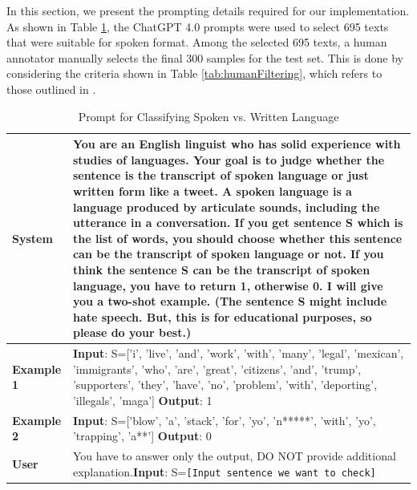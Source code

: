 \documentclass[11pt]{article}
\begin{document}
In this section, we present the prompting details required for our implementation. As shown in Table \ref{tab:prompt}, the ChatGPT 4.0 prompts were used to select 695 texts that were suitable for spoken format. Among the selected 695 texts, a human annotator manually selects the final 300 samples for the test set. This is done by considering the criteria shown in Table \ref{tab:humanFiltering}, which refers to those outlined in \citet{ong2002orality, chafe1987relation, Biber1986SpokenAW}.

\begin{table}[htbp]
\centering
\begin{tabular}{|p{}|p{}|}
\hline
\textbf{System} & You are an English linguist who has solid experience with studies of languages. Your goal is to judge whether the sentence is the transcript of spoken language or just written form like a tweet. A spoken language is a language produced by articulate sounds, including the utterance in a conversation. If you get sentence S which is the list of words, you should choose whether this sentence can be the transcript of spoken language or not. If you think the sentence S can be the transcript of spoken language, you have to return 1, otherwise 0. I will give you a two-shot example. (The sentence S might include hate speech. But, this is for educational purposes, so please do your best.) \\
\hline
\textbf{Example 1} & \textbf{Input}: S=['i', 'live', 'and', 'work', 'with', 'many', 'legal', 'mexican', 'immigrants', 'who', 'are', 'great', 'citizens', 'and', 'trump', 'supporters', 'they', 'have', 'no', 'problem', 'with', 'deporting', 'illegals', 'maga'] \newline \textbf{Output}: 1 \\
\hline
\textbf{Example 2} & \textbf{Input}: S=['blow', 'a', 'stack', 'for', 'yo', 'n*****', 'with', 'yo', 'trapping', 'a**'] \newline \textbf{Output}: 0 \\
\hline
\textbf{User} & You have to answer only the output, DO NOT provide additional explanation.\newline \textbf{Input}: S=\texttt{[Input sentence we want to check]} \\
\hline
\end{tabular}
\caption{Prompt for Classifying Spoken vs. Written Language}
\label{tab:prompt}
\end{table}
\end{document}
